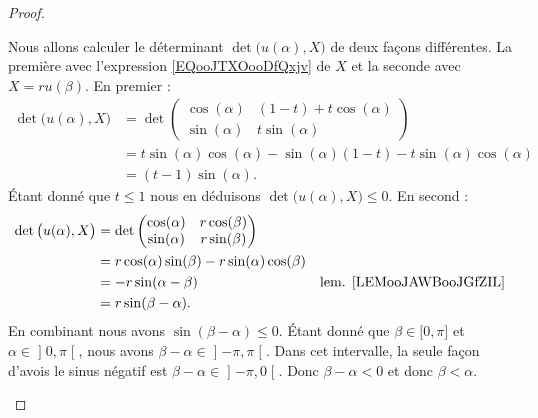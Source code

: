 \begin{proof}
\begin{subproof}
			\spitem[\( \beta\leq \alpha\)]
			Nous allons calculer le déterminant \( \det\big( u(\alpha),X \big)\) de deux façons différentes. La première avec l'expression \eqref{EQooJTXOooDfQxjv} de \( X\) et la seconde avec \( X=ru(\beta)\). En premier :
			\begin{subequations}
				\begin{align}
					\det\big( u(\alpha),X \big) & =\det\begin{pmatrix}
						                                   \cos(\alpha) & (1-t)+t\cos(\alpha) \\
						                                   \sin(\alpha) & t\sin(\alpha)
					                                   \end{pmatrix}                                \\
					                            & =t\sin(\alpha)\cos(\alpha)-\sin(\alpha)(1-t)-t\sin(\alpha)\cos(\alpha) \\
					                            & =(t-1)\sin(\alpha).
				\end{align}
			\end{subequations}
			Étant donné que \( t\leq 1\) nous en déduisons \( \det\big( u(\alpha),X \big)\leq 0\). En second :
			\begin{subequations}
				\begin{align}
					\det\big( u(\alpha),X \big) & =\det\begin{pmatrix}
						                                   \cos(\alpha) & r\cos(\beta) \\
						                                   \sin(\alpha) & r\sin(\beta)
					                                   \end{pmatrix}                                                         \\
					                            & =r\cos(\alpha)\sin(\beta)-r\sin(\alpha)\cos(\beta)                                       \\
					                            & =-r\sin(\alpha-\beta)                              & \text{lem. \ref{LEMooJAWBooJGfZIL}} \\
					                            & =r\sin(\beta-\alpha).
				\end{align}
			\end{subequations}
			En combinant nous avons \( \sin(\beta-\alpha)\leq 0\). Étant donné que \( \beta\in\mathopen[ 0,\pi\mathclose]\) et \( \alpha\in\mathopen] 0,\pi\mathclose[\), nous avons \( \beta-\alpha\in\mathopen] -\pi,\pi\mathclose[\). Dans cet intervalle, la seule façon d'avois le sinus négatif est \( \beta-\alpha\in\mathopen] -\pi,0\mathclose[\). Donc \( \beta-\alpha<0\) et donc \( \beta<\alpha\).
	\end{subproof}
\end{proof}


